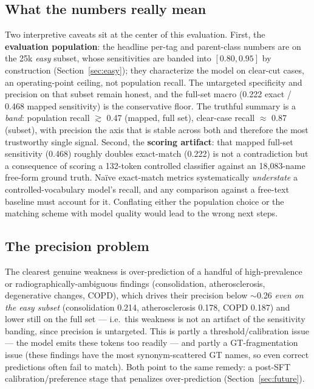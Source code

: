 \documentclass[11pt,a4paper]{article}
\begin{document}
\subsection{What the numbers really mean}
Two interpretive caveats sit at the center of this evaluation. First, the \textbf{evaluation population}: the headline per-tag and parent-class numbers are on the 25k \emph{easy} subset, whose sensitivities are banded into $[0.80,0.95]$ by construction (Section~\ref{sec:easy}); they characterize the model on clear-cut cases, an operating-point ceiling, not population recall. The untargeted specificity and precision on that subset remain honest, and the full-set macro (0.222 exact / 0.468 mapped sensitivity) is the conservative floor. The truthful summary is a \emph{band}: population recall $\gtrsim$ 0.47 (mapped, full set), clear-case recall $\approx$ 0.87 (subset), with precision the axis that is stable across both and therefore the most trustworthy single signal. Second, the \textbf{scoring artifact}: that mapped full-set sensitivity (0.468) roughly doubles exact-match (0.222) is not a contradiction but a consequence of scoring a 132-token controlled classifier against an 18{,}083-name free-form ground truth. Naïve exact-match metrics systematically \emph{understate} a controlled-vocabulary model's recall, and any comparison against a free-text baseline must account for it. Conflating either the population choice or the matching scheme with model quality would lead to the wrong next steps.

\subsection{The precision problem}
The clearest genuine weakness is over-prediction of a handful of high-prevalence or radiographically-ambiguous findings (consolidation, atherosclerosis, degenerative changes, COPD), which drives their precision below $\sim$0.26 \emph{even on the easy subset} (consolidation 0.214, atherosclerosis 0.178, COPD 0.187) and lower still on the full set --- i.e.\ this weakness is not an artifact of the sensitivity banding, since precision is untargeted. This is partly a threshold/calibration issue --- the model emits these tokens too readily --- and partly a GT-fragmentation issue (these findings have the most synonym-scattered GT names, so even correct predictions often fail to match). Both point to the same remedy: a post-SFT calibration/preference stage that penalizes over-prediction (Section~\ref{sec:future}).
\end{document}
